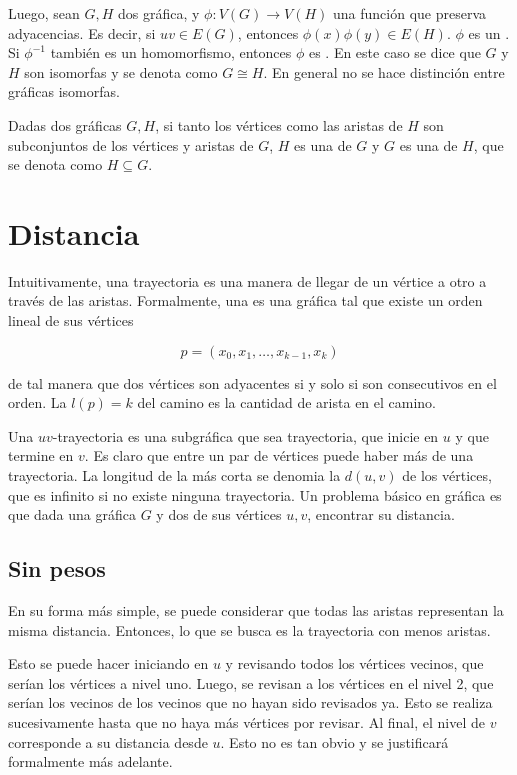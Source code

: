 Luego, sean $G, H$ dos gráfica, y $\phi: V(G) \to V(H)$ una función que preserva
adyacencias. Es decir, si $uv \in E(G)$, entonces $\phi(x)\phi(y) \in E(H)$.
$\phi$ es un . Si $\phi^{-1}$ también es un homomorfismo,
entonces $\phi$ es . En este caso se dice que $G$ y $H$ son
isomorfas y se denota como $G \cong H$. En general no se hace distinción entre
gráficas isomorfas.

Dadas dos gráficas $G, H$, si tanto los vértices como las aristas de $H$ son
subconjuntos de los vértices y aristas de $G$, $H$ es una  de
$G$ y $G$ es una  de $H$, que se denota como $H \subseteq G$.

\section{Distancia}

Intuitivamente, una trayectoria es una manera de llegar de un vértice a otro a
través de las aristas. Formalmente, una  es una gráfica tal que
existe un orden lineal de sus vértices

\[
    p = (x_{0}, x_{1}, \dots, x_{k-1}, x_{k})
\]

de tal manera que dos vértices son adyacentes si y solo si son consecutivos en
el orden. La  $l(p) = k$ del camino es la cantidad de arista en el
camino.

Una $uv$-trayectoria es una subgráfica que sea trayectoria, que inicie en $u$ y
que termine en $v$. Es claro que entre un par de vértices puede haber más de una
trayectoria. La longitud de la más corta se denomia la  $d(u, v)$
de los vértices, que es infinito si no existe ninguna trayectoria. Un problema
básico en gráfica es que dada una gráfica $G$ y dos de sus vértices $u, v$,
encontrar su distancia.

\subsection{Sin pesos}

En su forma más simple, se puede considerar que todas las aristas representan
la misma distancia. Entonces, lo que se busca es la trayectoria con menos
aristas.

Esto se puede hacer iniciando en $u$ y revisando todos los vértices vecinos, que
serían los vértices a nivel uno. Luego, se revisan a los vértices en el nivel 2,
que serían los vecinos de los vecinos que no hayan sido revisados ya. Esto se
realiza sucesivamente hasta que no haya más vértices por revisar. Al final, el
nivel de $v$ corresponde a su distancia desde $u$. Esto no es tan obvio y se
justificará formalmente más adelante.

